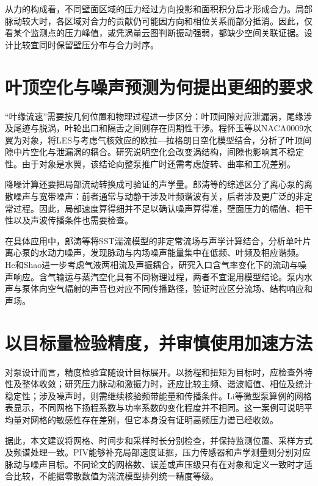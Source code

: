 \documentclass[UTF8,a4paper,zihao=-4,fontset=none,oneside]{ctexart}
\begin{document}
从力的构成看，不同壁面区域的压力经过方向投影和面积积分后才形成合力。局部脉动较大时，各区域对合力的贡献仍可能因方向和相位关系而部分抵消。因此，仅看某个监测点的压力峰值，或凭涡量云图判断振动强弱，都缺少空间关联证据。设计比较宜同时保留壁压分布与合力时序。

\section{叶顶空化与噪声预测为何提出更细的要求}

“叶缘流速”需要按几何位置和物理过程进一步区分：叶顶间隙对应泄漏涡，尾缘涉及尾迹与脱涡，叶轮出口和隔舌之间则存在周期性干涉。程怀玉等以NACA0009水翼为对象，将LES与考虑气核效应的欧拉—拉格朗日空化模型结合，分析了叶顶间隙中片空化与泄漏涡的耦合\cite{Cheng2021TLVCavitation}。研究说明空化会改变涡结构，间隙也影响其不稳定性。由于对象是水翼，该结论向整泵推广时还需考虑旋转、曲率和工况差别。

降噪计算还要把局部流动转换成可验证的声学量。郎涛等的综述区分了离心泵的离散噪声与宽带噪声：前者通常与动静干涉及叶频谐波有关，后者涉及更广泛的非定常过程\cite{Lang2021NoiseReview}。因此，局部速度算得细并不足以确认噪声算得准，壁面压力的幅值、相干性以及声波传播条件也需要检查。

在具体应用中，郎涛等将SST湍流模型的非定常流场与声学计算结合，分析单叶片离心泵的水动力噪声，发现脉动与内场噪声能量集中在低频、叶频及相应谐频\cite{Lang2022SingleBladeNoise}。He和Shao进一步考虑气液两相流及声振耦合，研究入口含气率变化下的流动与噪声响应\cite{He2021TwoPhaseNoise}。含气输运与蒸汽空化具有不同物理过程，两者不宜混用模型结论。泵内水声与泵体向空气辐射的声音也对应不同传播路径，验证时应区分流场、结构响应和声场。

\section{以目标量检验精度，并审慎使用加速方法}

对泵设计而言，精度检验宜随设计目标展开。以扬程和扭矩为目标时，应检查外特性及整体收敛；研究压力脉动和激振力时，还应比较主频、谐波幅值、相位及统计稳定性；涉及噪声时，则需继续核验频带能量和传播条件。Li等微型泵算例的网格表显示，不同网格下扬程系数与功率系数的变化程度并不相同\cite{Li2021PulseFlow}。这一案例可说明平均量对网格的敏感性存在差别，但它本身没有证明高频压力谱已经收敛。

据此，本文建议将网格、时间步和采样时长分别检查，并保持监测位置、采样方式及频谱处理一致。PIV能够补充局部速度证据，压力传感器和声学测量则分别对应脉动与噪声目标。不同论文的网格数、误差或声压级只有在对象和定义一致时才适合比较，不能据零散数值为湍流模型排列统一精度等级。
\end{document}
